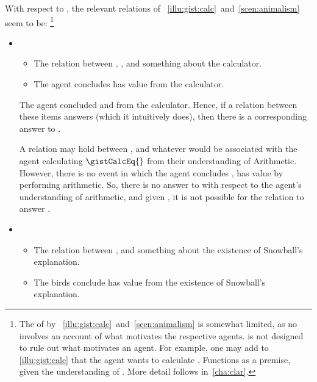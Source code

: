 \begin{note}
  With respect to \qWhy{}, the relevant relations of ~\ref{illu:gist:calc}~and~\ref{scen:animalism} seem to be:%
  \footnote{
    The  of \qWhy{} by ~\ref{illu:gist:calc}~and~\ref{scen:animalism} is somewhat limited, as no  involves an account of what motivates the respective agents.
    \qWhy{} is not designed to rule out what motivates an agent.
    For example, one may add to \autoref{illu:gist:calc} that the agent wants to calculate \gistCalcLHS{}.
    Functions as a premise, given the understanding of .
    More detail follows in~\autoref{cha:clar}.
  }

  \begin{itemize}[noitemsep]
  \item
    \begin{itemize}
    \item
      The relation between \propM{\gistCalcEq{}}, , and something about the calculator.
    \item
      The agent concludes \propM{\gistCalcEq{}} has value  from the calculator.
    \end{itemize}

    The agent concluded \propM{\gistCalcEq{}} and  from the calculator.
    Hence, if a relation between these items answers \qWhy{} (which it intuitively does), then there is a corresponding answer to \qHow{}.

    A relation may hold between \propM{\gistCalcEq{}},  and whatever \pool{} would be associated with the agent calculating \(\gistCalcEq{}\) from their understanding of Arithmetic.
    However, there is no event in which the agent concludes \propM{\gistCalcEq{}}, has value  by performing arithmetic.
    So, there is no answer to \qHow{} with respect to the agent's understanding of arithmetic, and given \issueInclusion{}, it is not possible for the relation to answer \qWhy{}.
  \item
    \begin{itemize}
    \item
      The relation between ,  and something about the existence of Snowball's explanation.
    \item
      The birds conclude  has value  from the existence of Snowball's explanation.
    \end{itemize}


\end{itemize}
\end{note}
